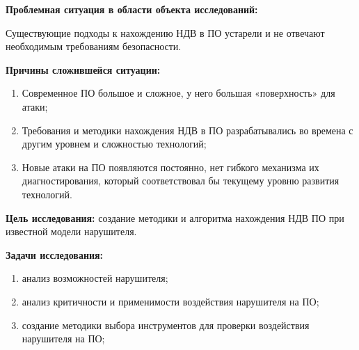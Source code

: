 \textbf{Проблемная ситуация в области объекта исследований:}

Существующие подходы к нахождению НДВ в ПО устарели и не отвечают необходимым требованиям безопасности.

\textbf{Причины сложившейся ситуации:}
\begin{enumerate}[label={\arabic*)}]
    \item Современное ПО большое и сложное, у него большая «поверхность» для атаки;
    \item Требования и методики нахождения НДВ в ПО разрабатывались во времена с другим уровнем и сложностью технологий;
    \item Новые атаки на ПО появляются постоянно, нет гибкого механизма их диагностирования, который соответствовал бы текущему уровню развития технологий.
\end{enumerate}

\textbf{Цель исследования:}
создание методики и алгоритма нахождения НДВ ПО при известной модели нарушителя.

\textbf{Задачи исследования:}
\begin{enumerate}[label={\arabic*)}]
    \item анализ возможностей нарушителя;
    \item анализ критичности и применимости воздействия нарушителя на ПО;
    \item создание методики выбора инструментов для проверки воздействия нарушителя на ПО;
\end{enumerate}
